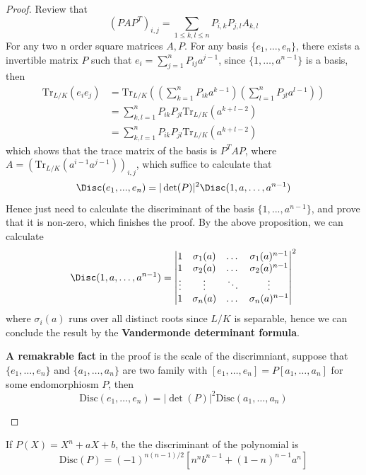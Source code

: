 \begin{proof}
  Review that 
  \[(PAP^T)_{i,j}  = \sum_{1\leq k,l \leq n}P_{i,k}P_{j,l}A_{k,l}\]
  For any two n order square matrices \(A,P\).
  For any basis \(\{e_1,...,e_n\}\), there exists a invertible matrix \(P\) such that \(e_i = \sum_{j=1}^n P_{ij} a^{j-1}\), since \(\{1,\dots,a^{n-1}\}\) is a basis, then 
  \begin{align*}
    \mathrm{Tr}_{L/K}(e_ie_j) &= \mathrm{Tr}_{L/K}\left(\left(\sum_{k=1}^n P_{ik} a^{k-1}\right)\left(\sum_{l=1}^n P_{jl} a^{l-1}\right)\right) \\
    &= \sum_{k,l=1}^n P_{ik}P_{jl}\mathrm{Tr}_{L/K}(a^{k+l-2}) \\
    &= \sum_{k,l=1}^n P_{ik}P_{jl}\mathrm{Tr}_{L/K}(a^{k+l-2})
  \end{align*}
  which shows that the trace matrix of the basis is \(P^T A P\), where \(A = (\mathrm{Tr}_{L/K}(a^{i-1}a^{j-1}))_{i,j}\), which suffice to calculate that
  \[\Disc(e_1,...,e_n) = |\det(P)|^2 \Disc(1,a,\dots,a^{n-1}) \]
  Hence just need to calculate the discriminant of the basis \(\{1,...,a^{n-1}\}\), and prove that it is non-zero, which finishes the proof. By the above proposition, we can calculate
  \[\Disc(1,a,\dots,a^{n-1}) = \begin{vmatrix}
    1 & \sigma_1(a) & \dots & \sigma_1(a)^{n-1} \\
    1 & \sigma_2(a) & \dots & \sigma_2(a)^{n-1} \\
    \vdots & \vdots & \ddots & \vdots \\ 
    1 & \sigma_n(a) & \dots & \sigma_n(a)^{n-1}
  \end{vmatrix}^2\]
  where \(\sigma_i(a)\) runs over all distinct roots since \(L/K\) is separable, hence we can conclude the result by the \textbf{Vandermonde determinant formula}.

  \begin{remark}
    \textbf{A remakrable fact} in the proof is the scale of the discrimniant, suppose that \(\{e_1,\dots,e_n\}\) and \(\{a_1,\dots,a_n\}\) are two family with \([e_1,\dots,e_n] = P[a_1,\dots,a_n]\) for some endomorphiosm \(P\), then 
    \[\mathrm{Disc}(e_1,\dots,e_n) = |\det(P)|^2 \mathrm{Disc}(a_1,\dots,a_n)\]
  \end{remark}

\end{proof}

\begin{colorexample}
    If \(P(X) = X^n+aX+b\), the the discriminant of the polynomial is 
    \[\mathrm{Disc}(P) = (-1)^{n(n-1)/2}[n^nb^{n-1} + (1-n)^{n-1}a^n]\]
\end{colorexample}
